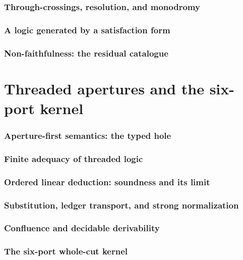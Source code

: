 \documentclass[11pt]{article}
\theoremstyle{definition}
\theoremstyle{remark}
\begin{document}
\section{Through-crossings, resolution, and monodromy}\label{sec:through}

\section{A logic generated by a satisfaction form}\label{sec:satisfaction-logic}

\section{Non-faithfulness: the residual catalogue}\label{sec:residual-catalogue}


\part{Threaded apertures and the six-port kernel}

\section{Aperture-first semantics: the typed hole}\label{sec:apertures}

\section{Finite adequacy of threaded logic}\label{sec:adequacy}

\section{Ordered linear deduction: soundness and its limit}\label{sec:ordered-linear}

\section{Substitution, ledger transport, and strong normalization}\label{sec:normalization}

\section{Confluence and decidable derivability}\label{sec:confluence-decidability}

\section{The six-port whole-cut kernel}\label{sec:six-port}

\end{document}
